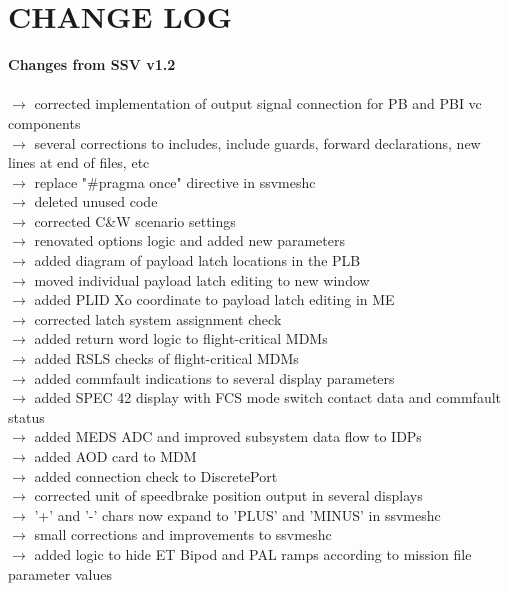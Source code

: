 \documentclass[Space_Shuttle_Vessel_Manual.tex]{subfiles}
\begin{document}
\section{CHANGE LOG}
\label{sec:change-log}
\noindent
\textbf{Changes from SSV v1.2}\\\\
$\rightarrow$ corrected implementation of output signal connection for PB and PBI vc components\\
$\rightarrow$ several corrections to includes, include guards, forward declarations, new lines at end of files, etc\\
$\rightarrow$ replace "\#pragma once" directive in ssvmeshc\\
$\rightarrow$ deleted unused code\\
$\rightarrow$ corrected C\&W scenario settings\\
$\rightarrow$ renovated options logic and added new parameters\\
$\rightarrow$ added diagram of payload latch locations in the PLB\\
$\rightarrow$ moved individual payload latch editing to new window\\
$\rightarrow$ added PLID Xo coordinate to payload latch editing in ME\\
$\rightarrow$ corrected latch system assignment check\\
$\rightarrow$ added return word logic to flight-critical MDMs\\
$\rightarrow$ added RSLS checks of flight-critical MDMs\\
$\rightarrow$ added commfault indications to several display parameters\\
$\rightarrow$ added SPEC 42 display with FCS mode switch contact data and commfault status\\
$\rightarrow$ added MEDS ADC and improved subsystem data flow to IDPs\\
$\rightarrow$ added AOD card to MDM\\
$\rightarrow$ added connection check to DiscretePort\\
$\rightarrow$ corrected unit of speedbrake position output in several displays\\
$\rightarrow$ '+' and '-' chars now expand to 'PLUS' and 'MINUS' in ssvmeshc\\
$\rightarrow$ small corrections and improvements to ssvmeshc\\
$\rightarrow$ added logic to hide ET Bipod and PAL ramps according to mission file parameter values\\
\end{document}
